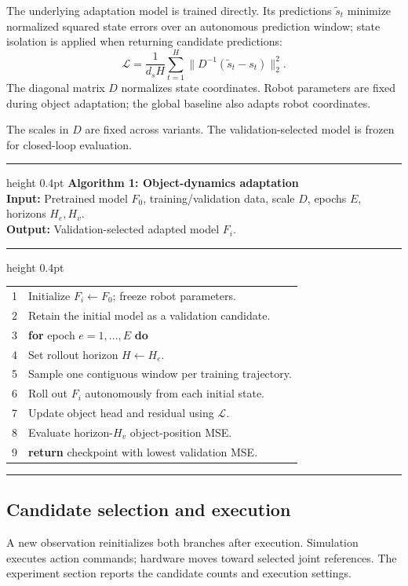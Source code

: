 \documentclass[conference]{IEEEtran}
\begin{document}
The underlying adaptation model is trained directly. Its predictions $\tilde s_t$ minimize normalized squared state errors over an autonomous prediction window; state isolation is applied when returning candidate predictions:
\begin{equation}
\mathcal L=\frac{1}{d_s H}\sum_{t=1}^{H}\|D^{-1}(\tilde s_t-s_t)\|_2^2.
\end{equation}
The diagonal matrix $D$ normalizes state coordinates. Robot parameters are fixed during object adaptation; the global baseline also adapts robot coordinates.


The scales in $D$ are fixed across variants. The validation-selected model is frozen for closed-loop evaluation.

\par\smallskip\noindent
\begin{minipage}{\linewidth}
\hrule height 0.4pt\smallskip
\textbf{Algorithm 1: Object-dynamics adaptation}\label{alg:adaptation}\\
\textbf{Input:} Pretrained model $F_0$, training/validation data, scale $D$, epochs $E$, horizons $H_e,H_v$.\\
\textbf{Output:} Validation-selected adapted model $F_i$.
\smallskip\hrule height 0.4pt\smallskip
\begin{tabular}{@{}r@{\quad}p{.87\linewidth}@{}}
1 & Initialize $F_i\leftarrow F_0$; freeze robot parameters.\\
2 & Retain the initial model as a validation candidate.\\
3 & \textbf{for} epoch $e=1,\ldots,E$ \textbf{do}\\
4 & \quad Set rollout horizon $H\leftarrow H_e$.\\
5 & \quad Sample one contiguous window per training trajectory.\\
6 & \quad Roll out $F_i$ autonomously from each initial state.\\
7 & \quad Update object head and residual using $\mathcal L$.\\
8 & \quad Evaluate horizon-$H_v$ object-position MSE.\\
9 & \textbf{return} checkpoint with lowest validation MSE.
\end{tabular}
\smallskip\hrule
\end{minipage}\par\smallskip

\subsection{Candidate selection and execution}
A new observation reinitializes both branches after execution. Simulation executes action commands; hardware moves toward selected joint references. The experiment section reports the candidate counts and execution settings.
\end{document}

